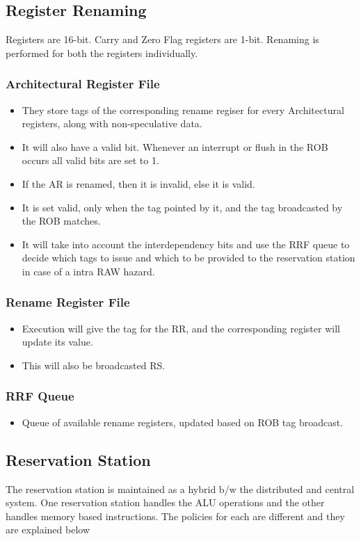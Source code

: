 \documentclass{article}
\begin{document}
\subsection{Register Renaming}
Registers are 16-bit.
Carry and Zero Flag registers are 1-bit.
Renaming is performed for both the registers individually.
\subsubsection{Architectural Register File}
\begin{itemize}
\item They store tags of the corresponding rename regiser for every Architectural registers, along with non-speculative data.
\item It will also have a valid bit. Whenever an interrupt or flush in the ROB occurs all valid bits are set to 1.
\item If the AR is renamed, then it is invalid, else it is valid.
\item It is set valid, only when the tag pointed by it, and the tag broadcasted by the ROB matches.
\item It will take into account the interdependency bits and use the RRF queue to decide which tags to issue and which to be provided to the 
reservation station in case of a intra RAW hazard.
\end{itemize}
\subsubsection{Rename Register File}
\begin{itemize}
\item Execution will give the tag for the RR, and the corresponding register will update its value.
\item This will also be broadcasted RS.
\end{itemize}
\subsubsection{RRF Queue}
\begin{itemize}
\item Queue of available rename registers, updated based on ROB tag broadcast.
\end{itemize}
\subsection{Reservation Station}
The reservation station is maintained as a hybrid b/w the distributed and central system. One reservation station handles the ALU operations and the other handles memory based instructions. The policies for each are different and they are explained below
\end{document}
